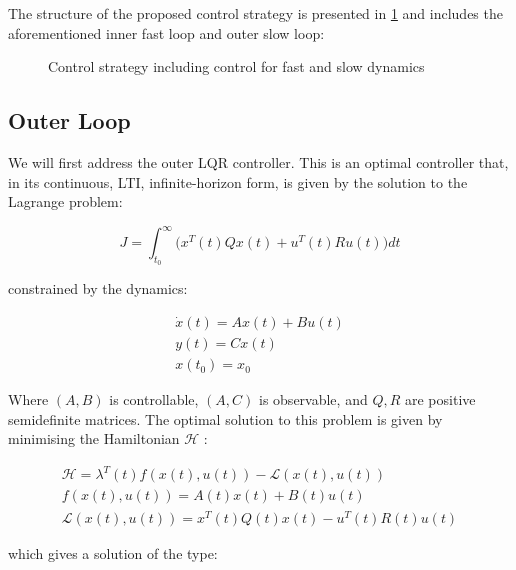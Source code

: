The structure of the proposed control strategy is presented in \cref{fig:tikzControlStrat} and includes the aforementioned inner fast loop and outer slow loop:  

\begin{figure}[h!]
	\centering
	\resizebox{\columnwidth}{!}{
	}
	\caption{Control strategy including control for fast and slow dynamics}
	\label{fig:tikzControlStrat}
\end{figure}

\subsection{Outer Loop}\label{subsec:OuterLoop}

We will first address the outer LQR controller. This is an optimal controller that, in its continuous, LTI, infinite-horizon form, is given by the solution to the Lagrange problem:

\begin{equation}\label{eq:LagrangeProblem}
		J = \int_{t_0}^{\infty} \big(x^T(t)Qx(t) + u^T(t)Ru(t)\big)dt
\end{equation} 

constrained by the dynamics:

\begin{equation}\label{eq:LQRDynamicsConstraint}
	\begin{gathered}
		\dot{x}(t) = Ax(t) + Bu(t) \\
		y(t) = Cx(t) \\
		x(t_0) = x_0
	\end{gathered} 
\end{equation}

Where $(A,B)$ is controllable, $(A,C)$ is observable, and $Q,R$ are positive semidefinite matrices. The optimal solution to this problem is given by minimising the Hamiltonian $\mathcal{H}$ \cite{Liberzon2012}:

\begin{equation}\label{eq:Hamiltonian}
	\begin{gathered}
			\mathcal{H} = \lambda^T(t) f(x(t),u(t)) - \mathcal{L}(x(t),u(t)) \\
			f(x(t),u(t)) = A(t)x(t) + B(t)u(t) \\
			\mathcal{L}(x(t),u(t)) =  x^T(t)Q(t)x(t) - u^T(t)R(t)u(t)
	\end{gathered}
\end{equation}

which gives a solution of the type:

